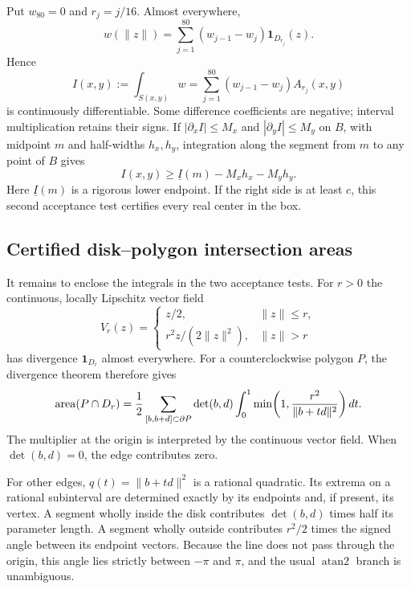 \documentclass[11pt]{article}
\begin{document}
Put $w_{80}=0$ and $r_j=j/16$. Almost everywhere,
\[
w(\|z\|)=\sum_{j=1}^{80}(w_{j-1}-w_j)\mathbf1_{D_{r_j}}(z).
\]
Hence
\begin{equation}\label{eq:integral}
I(x,y):=\int_{S(x,y)}w
=\sum_{j=1}^{80}(w_{j-1}-w_j)A_{r_j}(x,y)
\end{equation}
is continuously differentiable. Some difference coefficients are negative; interval multiplication retains their signs. If $|\partial_x I|\le M_x$ and $|\partial_y I|\le M_y$ on $B$, with midpoint $m$ and half-widths $h_x,h_y$, integration along the segment from $m$ to any point of $B$ gives
\begin{equation}\label{eq:gradient}
I(x,y)\ge\underline I(m)-M_xh_x-M_yh_y.
\end{equation}
Here $\underline I(m)$ is a rigorous lower endpoint. If the right side is at least $c$, this second acceptance test certifies every real center in the box.

\subsection{Certified disk--polygon intersection areas}
It remains to enclose the integrals in the two acceptance tests. For $r>0$ the continuous, locally Lipschitz vector field
\[
V_r(z)=\begin{cases}z/2,&\|z\|\le r,\\
r^2z/(2\|z\|^2),&\|z\|>r
\end{cases}
\]
has divergence $\mathbf1_{D_r}$ almost everywhere. For a counterclockwise polygon $P$, the divergence theorem therefore gives
\begin{equation}\label{eq:green}
\operatorname{area}(P\cap D_r)=\frac12\sum_{[b,b+d]\subset\partial P}
\det(b,d)\int_0^1\min\!\left(1,\frac{r^2}{\|b+td\|^2}\right)dt.
\end{equation}
The multiplier at the origin is interpreted by the continuous vector field. When $\det(b,d)=0$, the edge contributes zero.

For other edges, $q(t)=\|b+td\|^2$ is a rational quadratic. Its extrema on a rational subinterval are determined exactly by its endpoints and, if present, its vertex. A segment wholly inside the disk contributes $\det(b,d)$ times half its parameter length. A segment wholly outside contributes $r^2/2$ times the signed angle between its endpoint vectors. Because the line does not pass through the origin, this angle lies strictly between $-\pi$ and $\pi$, and the usual $\operatorname{atan2}$ branch is unambiguous.
\end{document}
